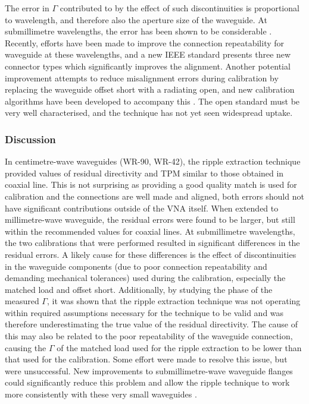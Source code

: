 \documentclass[../thesis/thesis.tex]{subfiles}
\begin{document}
The error in $\Gamma$ contributed to by the effect of such discontinuities is proportional to wavelength, and therefore also the aperture size of the waveguide. At submillimetre wavelengths, the error has been shown to be considerable \cite{Williams_2011, Li_2012}. Recently, efforts have been made to improve the connection repeatability for waveguide at these wavelengths, and a new IEEE standard \cite{IEEE1785} presents three new connector types which significantly improves the alignment. Another potential improvement attempts to reduce misalignment errors during calibration by replacing the waveguide offset short with a radiating open, and new calibration algorithms have been developed to accompany this \cite{Arsenovic_2014}. The open standard must be very well characterised, and the technique has not yet seen widespread uptake.

\subsubsection{Discussion}

In centimetre-wave waveguides (WR-90, WR-42), the ripple extraction technique provided values of residual directivity and TPM similar to those obtained in coaxial line. This is not surprising as providing a good quality match is used for calibration and the connections are well made and aligned, both errors should not have significant contributions outside of the VNA itself. When extended to millimetre-wave waveguide, the residual errors were found to be larger, but still within the recommended values for coaxial lines. At submillimetre wavelengths, the two calibrations that were performed resulted in significant differences in the residual errors. A likely cause for these differences is the effect of discontinuities in the waveguide components (due to poor connection repeatability and demanding mechanical tolerances) used during the calibration, especially the matched load and offset short. Additionally, by studying the phase of the measured $\Gamma$, it was shown that the ripple extraction technique was not operating within required assumptions necessary for the technique to be valid and was therefore underestimating the true value of the residual directivity. The cause of this may also be related to the poor repeatability of the waveguide connection, causing the $\Gamma$ of the matched load used for the ripple extraction to be lower than that used for the calibration. Some effort were made to resolve this issue, but were unsuccessful. New improvements to submillimetre-wave waveguide flanges could significantly reduce this problem and allow the ripple technique to work more consistently with these very small waveguides \cite{IEEE1785}.
\end{document}
